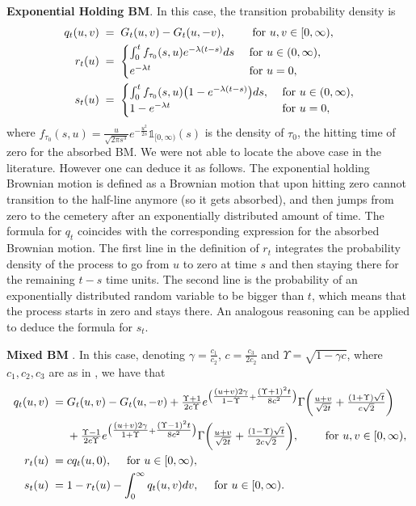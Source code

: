 \documentclass[12pt,a4paper]{article}
\theoremstyle{plain}
\theoremstyle{remark}
\newcommand{\pfrac}[2]{\genfrac{}{}{}{1}{#1}{#2}}
\newcommand{\one}{\mathds{1}}
\begin{document}
	
	\textbf{Exponential Holding BM}. In this case, the transition probability density is 
	\begin{align}
		{q}_t(u,v) & \;=\; G_t(u,v) -  G_t(u,- v),
		\qquad \text{ for }u,v\in [0,\infty), \notag \\
		{r}_t(u) & \;=\; 
		\begin{cases}
			\int_{0}^t f_{\tau_0}(s,u) e^{-\lambda (t-s)}ds &  \text{ for } u\in(0,\infty),\vspace{2pt}\\
			e^{-\lambda t} & \text{ for } u=0,
		\end{cases} \label{eq_exp}\\
		{s}_t(u) & \;=\; 
		\begin{cases}
			\int_{0}^t f_{\tau_0}(s,u) \big(1- e^{-\lambda (t-s)}\big)ds, & \text{ for } u\in (0,\infty),\\
			1- e^{-\lambda t} & \text{ for } u=0,\notag
		\end{cases}
	\end{align}
	where  
	$f_{\tau_0}(s,u) = \frac{u}{\sqrt{2\pi s^3}}e^{-\frac{u^2}{2s}}\one_{[0,\infty)}(s)$ is the density of $\tau_0$, the hitting time of zero for the absorbed BM.
	We were not able to locate the above case in the literature. However one can deduce it as follows. The exponential holding Brownian motion is defined as a Brownian motion that upon hitting zero cannot transition to the half-line anymore (so it gets absorbed), and then jumps from zero to the cemetery after an exponentially distributed amount of time. The formula for $q_t$ coincides with the corresponding expression for the absorbed Brownian motion. The first line in the definition of $r_t$ integrates the probability density of the process to go from $u$ to zero at time $s$ and then staying there for the remaining $t-s$ time units. The second line is the probability of an exponentially distributed random variable to be bigger than $t$, which means that the process starts in zero and stays there. An analogous reasoning can be applied to deduce the formula for $s_t$. \bigskip
	
	
	\textbf{Mixed BM} \cite[Page 125]{handbook}. In this case, denoting $\gamma = \frac{c_1}{c_2}$,   $c = \frac{c_3}{2c_2}$ and $\Upsilon = \sqrt{1 - \gamma c}$,  where $c_1, c_2, c_3$ are as in \citealp[Theorem 2.10]{EFJP}, we have that
	\begin{align*}
		{q}_t(u,v)  \;=\; &  G_t(u,v) -  G_t(u,- v)  + \pfrac{\Upsilon + 1}{2 c \Upsilon}e^{\big(\pfrac{(u + v)2\gamma}{1 - \Upsilon} + \pfrac{(\Upsilon + 1)^2 t}{8 c^2}\big)}\Gamma\bigg( \pfrac{u + v}{\sqrt{2t}} + \pfrac{(1 + \Upsilon)\sqrt{t}}{c\sqrt{2}}\bigg) \\
		& + \pfrac{\Upsilon - 1}{2 c \Upsilon} e^{\big( \pfrac{(u + v)2\gamma}{1 + \Upsilon} + \pfrac{(\Upsilon - 1)^2 t}{8 c^2}\big)} \Gamma\bigg(\pfrac{u + v}{\sqrt{2t}} + \pfrac{(1 - \Upsilon)\sqrt{t}}{2c\sqrt{2}}\bigg), 	\qquad \text{ for }u,v\in [0,\infty),\\
		{r}_t(u)  \;=\;  &c q_t(u,0), \quad \text{ for } u\in [0,\infty),\\
		{s}_t(u)    \;=\;  & 1-  r_t(u) - \int_0^\infty q_t(u,v)dv, \quad \text{ for } u\in [0,\infty).
	\end{align*}
	
\end{document}
